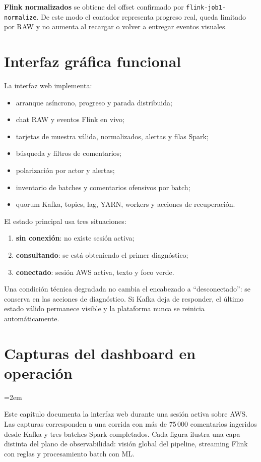 \documentclass[11pt,a4paper,openany]{report}
\newcommand{\topic}[1]{\texttt{#1}}
\begin{document}
\textbf{Flink normalizados} se obtiene del offset confirmado por \topic{flink-job1-normalize}. De este modo el contador representa progreso real, queda limitado por RAW y no aumenta al recargar o volver a entregar eventos visuales.

\chapter{Interfaz gráfica funcional}

La interfaz web implementa:

\begin{itemize}
  \item arranque asíncrono, progreso y parada distribuida;
  \item chat RAW y eventos Flink en vivo;
  \item tarjetas de muestra válida, normalizados, alertas y filas Spark;
  \item búsqueda y filtros de comentarios;
  \item polarización por actor y alertas;
  \item inventario de batches y comentarios ofensivos por batch;
  \item quorum Kafka, topics, lag, YARN, workers y acciones de recuperación.
\end{itemize}

El estado principal usa tres situaciones:

\begin{enumerate}
  \item \textbf{sin conexión}: no existe sesión activa;
  \item \textbf{consultando}: se está obteniendo el primer diagnóstico;
  \item \textbf{conectado}: sesión AWS activa, texto y foco verde.
\end{enumerate}

Una condición técnica degradada no cambia el encabezado a ``desconectado'': se conserva en las acciones de diagnóstico. Si Kafka deja de responder, el último estado válido permanece visible y la plataforma nunca se reinicia automáticamente.

\chapter{Capturas del dashboard en operación}

\begingroup\sloppy\emergencystretch=2em

Este capítulo documenta la interfaz web durante una sesión activa sobre AWS. Las capturas corresponden a una corrida con más de 75\,000 comentarios ingeridos desde Kafka y tres batches Spark completados. Cada figura ilustra una capa distinta del plano de observabilidad: visión global del pipeline, streaming Flink con reglas y procesamiento batch con ML.
\end{document}
